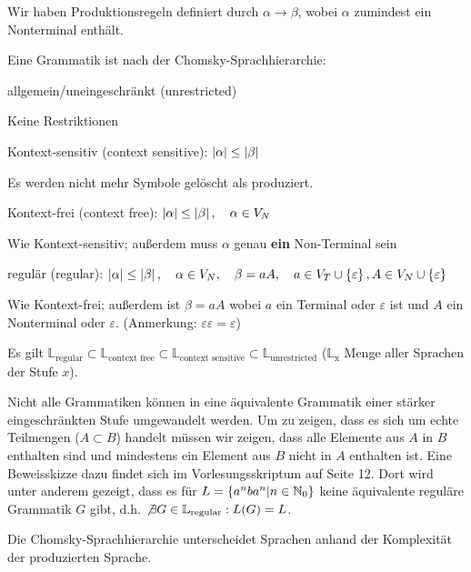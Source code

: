 Wir haben Produktionsregeln definiert durch $\alpha \to \beta$, wobei
$\alpha$ zumindest ein Nonterminal enthält.
\begin{defn}
Eine Grammatik ist nach der Chomsky-Sprachhierarchie:
\begin{\whichitem}
\item allgemein/uneingeschränkt (unrestricted)

Keine Restriktionen
\item Kontext-sensitiv (context sensitive): $\left\lvert{\alpha}\right\rvert \leq \left\lvert{\beta}\right\rvert$

Es werden nicht mehr Symbole gelöscht als produziert.
\item Kontext-frei (context free): $\left\lvert{\alpha}\right\rvert \leq \left\lvert{\beta}\right\rvert, \quad \alpha \in V_N$

Wie Kontext-sensitiv; außerdem muss $\alpha$ genau \textbf{ein} Non-Terminal sein
\item regulär (regular): $\left\lvert{\alpha}\right\rvert \leq \left\lvert{\beta}\right\rvert, \quad \alpha \in V_N, \quad \beta=aA, \quad a \in V_T \cup \left\{\varepsilon\right\}, A \in V_N \cup \left\{\varepsilon\right\}$

Wie Kontext-frei; außerdem ist $\beta=aA$ wobei $a$ ein Terminal oder $\varepsilon$ ist und $A$ ein Nonterminal oder $\varepsilon$. (Anmerkung: $\varepsilon\varepsilon=\varepsilon$)
\end{\whichitem}
Es gilt $\mathbb{L}_{\text{regular}} \subset \mathbb{L}_{\text{context free}} \subset \mathbb{L}_{\text{context sensitive}} \subset \mathbb{L}_{\text{unrestricted}}$ ($\mathbb{L}_{\text{x}}$ Menge aller Sprachen der Stufe $x$).
\end{defn}

Nicht alle Grammatiken können in eine äquivalente Grammatik einer stärker eingeschränkten Stufe umgewandelt werden. Um zu zeigen, dass es sich um echte Teilmengen ($A \subset B$) handelt müssen wir zeigen, dass alle Elemente aus $A$ in $B$ enthalten sind und mindestens ein Element aus $B$ nicht in $A$ enthalten ist.
Eine Beweisskizze dazu findet sich im Vorlesungsskriptum auf Seite 12. Dort wird unter anderem gezeigt, dass es für $L=\left\{a^n b a^n|n \in \mathbb{N}_0\right\}$ keine äquivalente reguläre Grammatik $G$ gibt, d.h. $\not \exists G \in \mathbb{L}_{\text{regular}} : L(G) = L$.

Die Chomsky-Sprachhierarchie unterscheidet Sprachen anhand der Komplexität der produzierten Sprache.

